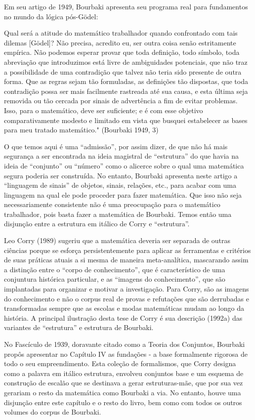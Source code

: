 \documentclass[a4paper,12pt]{article}[abntex2]
\begin{document}
Em seu artigo de 1949, Bourbaki apresenta seu programa real para fundamentos no mundo da lógica pós-Gödel:

Qual será a atitude do matemático trabalhador quando confrontado com tais dilemas [Gödel]? Não precisa, acredito eu, ser outra coisa senão estritamente empírica. Não podemos esperar provar que toda definição, todo símbolo, toda abreviação que introduzimos está livre de ambiguidades potenciais, que não traz a possibilidade de uma contradição que talvez não teria sido presente de outra forma. Que as regras sejam tão formuladas, as definições tão dispostas, que toda contradição possa ser mais facilmente rastreada até sua causa, e esta última seja removida ou tão cercada por sinais de advertência a fim de evitar problemas. Isso, para o matemático, deve ser suficiente; e é com esse objetivo comparativamente modesto e limitado em vista que busquei estabelecer as bases para meu tratado matemático." (Bourbaki 1949, 3)

O que temos aqui é uma “admissão”, por assim dizer, de que não há mais segurança a ser encontrada na ideia magistral de “estrutura” do que havia na ideia de “conjunto” ou “número” como o alicerce sobre o qual uma matemática segura poderia ser construída. No entanto, Bourbaki apresenta neste artigo a “linguagem de sinais” de objetos, sinais, relações, etc., para acabar com uma linguagem na qual ele pode proceder para fazer matemática. Que isso não seja necessariamente consistente não é uma preocupação para o matemático trabalhador, pois basta fazer a matemática de Bourbaki. Temos então uma disjunção entre a estrutura em itálico de Corry e “estrutura”.

Leo Corry (1989) sugeriu que a matemática deveria ser separada de outras ciências porque se esforça persistentemente para aplicar as ferramentas e critérios de suas práticas atuais a si mesma de maneira meta-analítica, mascarando assim a distinção entre o “corpo de conhecimento”, que é característico de uma conjuntura histórica particular, e as “imagens do conhecimento”, que são implantadas para organizar e motivar a investigação. Para Corry, são as imagens do conhecimento e não o corpus real de provas e refutações que são derrubadas e transformadas sempre que as escolas e modas matemáticas mudam ao longo da história. A principal ilustração desta tese de Corry é sua descrição (1992a) das variantes de “estrutura” e estrutura de Bourbaki.

No Fascículo de 1939, doravante citado como a Teoria dos Conjuntos, Bourbaki propôs apresentar no Capítulo IV as fundações - a base formalmente rigorosa de todo o seu empreendimento. Esta coleção de formalismos, que Corry designa como a palavra em itálico estrutura, envolveu conjuntos base e um esquema de construção de escalão que se destinava a gerar estruturas-mãe, que por sua vez gerariam o resto da matemática como Bourbaki a via. No entanto, houve uma disjunção entre este capítulo e o resto do livro, bem como com todos os outros volumes do corpus de Bourbaki.
\end{document}
